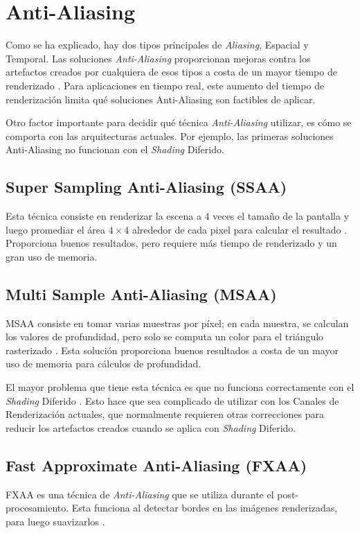 \documentclass[pregrado]{tesis-usb} %
\begin{document}
\section{Anti-Aliasing}
Como se ha explicado, hay dos tipos principales de \textit{Aliasing}, Espacial y Temporal. Las soluciones \textit{Anti-Aliasing} proporcionan mejoras contra los artefactos creados por cualquiera de esos tipos a costa de un mayor tiempo de renderizado \cite{Doggett2017EDAN35}. Para aplicaciones en tiempo real, este aumento del tiempo de renderización limita qué soluciones Anti-Aliasing son factibles de aplicar.

Otro factor importante para decidir qué técnica \textit{Anti-Aliasing} utilizar,  es cómo se comporta con las arquitecturas actuales. Por ejemplo, las primeras  soluciones Anti-Aliasing no funcionan con el \textit{Shading} Diferido.


\subsection{Super Sampling Anti-Aliasing (SSAA)}
Esta técnica consiste en renderizar la escena a $4$ veces el tamaño de la pantalla y luego promediar el área $4\times 4$ alrededor de cada pixel para calcular el resultado \cite{Doggett2017EDAN35}. Proporciona buenos resultados, pero requiere más tiempo de renderizado y un gran uso de memoria.

\subsection{Multi Sample Anti-Aliasing (MSAA)}
MSAA consiste en tomar varias muestras por píxel; en cada muestra, se calculan los valores de profundidad, pero solo se computa un color para el triángulo rasterizado \cite{Doggett2017EDAN35}. Esta solución proporciona buenos resultados a costa de un mayor uso de memoria para cálculos de profundidad.

El mayor problema que tiene esta técnica es que no funciona correctamente con el \textit{Shading} Diferido \cite{Doggett2017EDAN35}. Esto hace que sea complicado de utilizar con los Canales de Renderización actuales, que normalmente requieren otras correcciones para reducir los artefactos creados cuando se aplica con \textit{Shading} Diferido.


\subsection{Fast Approximate Anti-Aliasing (FXAA)}
FXAA es una técnica de \textit{Anti-Aliasing} que se utiliza durante el post-procesamiento. Esta funciona al detectar bordes en las imágenes renderizadas, para luego suavizarlos \cite{Lottes2009}.
\end{document}
